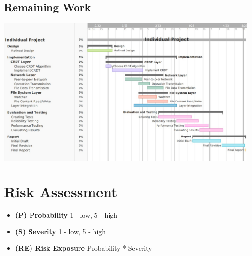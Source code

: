 \documentclass[12pt]{report}
\begin{document}
\subsection{Remaining Work}\label{sec:remaining}
\begin{center}
    \includegraphics[width=16cm]{images/remaining.jpg}
\end{center} 


\section{Risk Assessment}

\begin{itemize}
    \item \textbf{(P) Probability} 1 - low, 5 - high
    \item \textbf{(S) Severity}  1 - low, 5 - high
    \item \textbf{(RE) Risk Exposure} Probability * Severity
\end{itemize}
\end{document}
